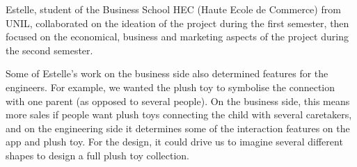 Estelle, student of the Business School HEC (Haute Ecole de Commerce) from UNIL, collaborated on the ideation of the project during the first semester, then focused on the economical, business and marketing aspects of the project during the second semester. 

\medskip Some of Estelle's work on the business side also determined features for the engineers. For example, we wanted the plush toy to symbolise the connection with one parent (as opposed to several people). On the business side, this means more sales if people want plush toys connecting the child with several caretakers, and on the engineering side it determines some of the interaction features on the app and plush toy. For the design, it could drive us to imagine several different shapes to design a full plush toy collection.


\newpage


